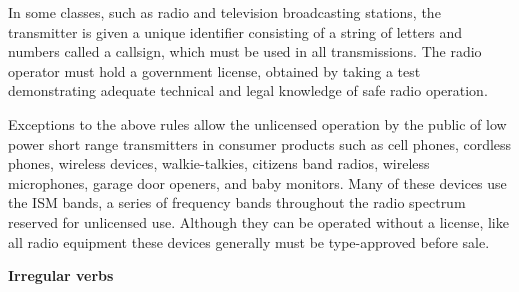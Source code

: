 \documentclass[a4paper, twoside, 12pt]{book}
\begin{document}
In some classes, such as radio and television broadcasting stations, the transmitter is given a unique identifier consisting of a string of letters and numbers called a callsign, which must be used in all transmissions. The radio operator must hold a government license, obtained by taking a test demonstrating adequate technical and legal knowledge of safe radio operation.

Exceptions to the above rules allow the unlicensed operation by the public of low power short range transmitters in consumer products such as cell phones, cordless phones, wireless devices, walkie-talkies, citizens band radios, wireless microphones, garage door openers, and baby monitors. Many of these devices use the ISM bands, a series of frequency bands throughout the radio spectrum reserved for unlicensed use. Although they can be operated without a license, like all radio equipment these devices generally must be type-approved before sale.

\vfill{}

\pagebreak

{\noindent \textbf{Irregular verbs}}
\vspace{6pt}
\end{document}
